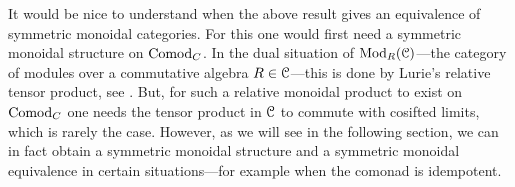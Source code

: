 \begin{remark}
    \label{ch2:rm:monoidal-structure-comodules}
    It would be nice to understand when the above result gives an equivalence of symmetric monoidal categories. For this one would first need a symmetric monoidal structure on $\mathrm{Comod}_C$. In the dual situation of $\mathrm{Mod}_R(\EuScript{C})$---the category of modules over a commutative algebra $R\in \EuScript{C}$---this is done by Lurie's relative tensor product, see \cite[Section 4.5.2]{Lurie_HA}. But, for such a relative monoidal product to exist on $\mathrm{Comod}_C$ one needs the tensor product in $\EuScript{C}$ to commute with cosifted limits, which is rarely the case. However, as we will see in the following section, we can in fact obtain a symmetric monoidal structure and a symmetric monoidal equivalence in certain situations---for example when the comonad is idempotent. 
\end{remark}

